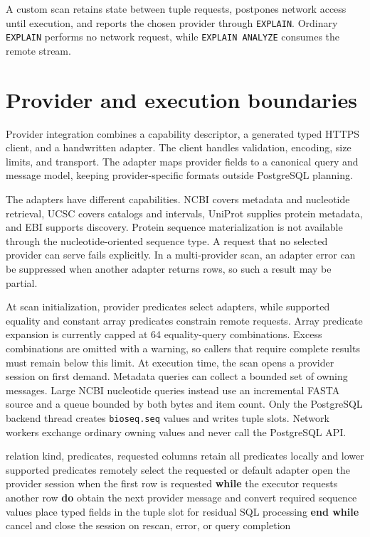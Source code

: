 A custom scan retains state between tuple requests, postpones network access
until execution, and reports the chosen provider through \texttt{EXPLAIN}.
Ordinary \texttt{EXPLAIN} performs no network request, while \texttt{EXPLAIN
ANALYZE} consumes the remote stream.

\section{Provider and execution boundaries}
\label{sec:external-provider-boundary}

Provider integration combines a capability descriptor, a generated typed HTTPS
client, and a handwritten adapter. The client handles validation, encoding,
size limits, and transport. The adapter maps provider fields to a canonical
query and message model, keeping provider-specific formats outside PostgreSQL
planning.

The adapters have different capabilities. NCBI covers metadata and nucleotide
retrieval, UCSC covers catalogs and intervals, UniProt supplies protein
metadata, and EBI supports discovery. Protein sequence materialization is not
available through the nucleotide-oriented sequence type. A request that no
selected provider can serve fails explicitly. In a multi-provider scan, an
adapter error can be suppressed when another adapter returns rows, so such a
result may be partial.

At scan initialization, provider predicates select adapters, while supported equality
and constant array predicates constrain remote requests. Array predicate
expansion is currently capped at 64 equality-query combinations. Excess
combinations are omitted with a warning, so callers that require complete
results must remain below this limit. At execution time, the scan opens a
provider session on first demand. Metadata queries can collect a bounded set of
owning messages. Large NCBI nucleotide queries instead use an incremental
FASTA source and a queue bounded by both bytes and item count. Only the
PostgreSQL backend thread creates \texttt{bioseq.seq} values and writes tuple
slots. Network workers exchange ordinary owning values and never call the
PostgreSQL API.

\begin{algorithm}[htbp]
  \caption{External relation scan}
  \label{alg:external-relation-scan}
  \begin{algorithmic}[1]
    \Require relation kind, predicates, requested columns
    \State retain all predicates locally and lower supported predicates remotely
    \State select the requested or default adapter
    \State open the provider session when the first row is requested
    \State \textbf{while} the executor requests another row \textbf{do}
      \State obtain the next provider message and convert required sequence values
      \State place typed fields in the tuple slot for residual SQL processing
    \State \textbf{end while}
    \State cancel and close the session on rescan, error, or query completion
  \end{algorithmic}
\end{algorithm}

